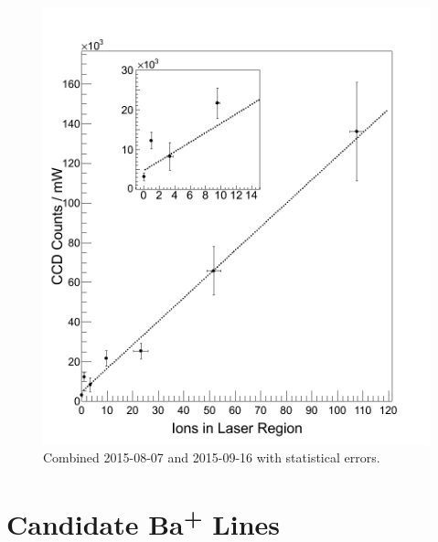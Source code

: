\begin{figure} %
        \centering
                \includegraphics[width=.7\textwidth]{figures/fitgrouped_20150807_20150916_inset.png}
                \caption{Combined 2015-08-07 and 2015-09-16 with statistical errors.}
\label{fig:lin}
\end{figure}

\section{Candidate Ba\textsuperscript{+} Lines}
\label{sec:BaPlus}